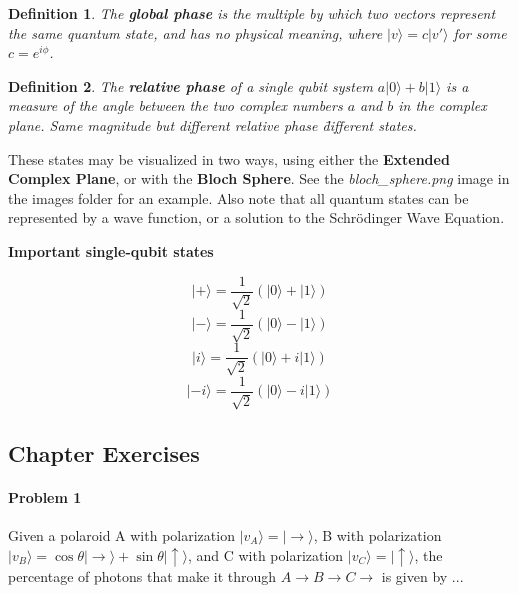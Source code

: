 \documentclass[12pt]{article}
\theoremstyle{mytheor}
\newtheorem{defi}{Definition}
\begin{document}
\begin{defi}
The \textbf{global phase} is the multiple by which two vectors represent the same quantum state, and has no physical meaning, where \(|v\rangle = c|v'\rangle\) for some \(c=e^{i\phi}\).
\end{defi}

\begin{defi}
The \textbf{relative phase} of a single qubit system \(a|0\rangle + b|1\rangle\) is a measure of the angle between the two complex numbers $a$ and $b$ in the complex plane. Same magnitude but different relative phase \= different states.
\end{defi}

These states may be visualized in two ways, using either the \textbf{Extended Complex Plane}, or with the \textbf{Bloch Sphere}. See the \textit{bloch\_sphere.png} image in the images folder for an example. Also note that all quantum states can be represented by a wave function, or a solution to the Schr\"odinger Wave Equation.

\textbf{Important single-qubit states}

$$|+\rangle = \frac{1}{\sqrt{2}}(|0\rangle + |1\rangle)$$
$$|-\rangle = \frac{1}{\sqrt{2}}(|0\rangle - |1\rangle)$$
$$|i\rangle = \frac{1}{\sqrt{2}}(|0\rangle + i|1\rangle)$$
$$|-i\rangle = \frac{1}{\sqrt{2}}(|0\rangle - i|1\rangle)$$

\subsection{Chapter Exercises}

\paragraph{Problem 1}
Given a polaroid A with polarization $|v_A\rangle = |\rightarrow\rangle$, B with polarization $|v_B\rangle = \cos\theta|\rightarrow\rangle + \sin\theta|\uparrow\rangle$, and C with polarization $|v_C\rangle = |\uparrow\rangle$, the percentage of photons that make it through $A \rightarrow B \rightarrow C \rightarrow$ is given by ...
\end{document}
